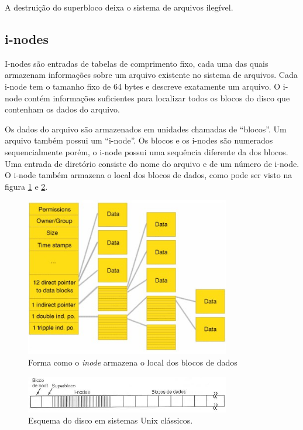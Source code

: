 \begin{citacao}
A destruição do superbloco deixa o sistema de arquivos ilegível.
\end{citacao}

\subsection{i-nodes}

I-nodes são entradas de tabelas de comprimento fixo, cada uma das quais armazenam informações sobre um arquivo existente no sistema de arquivos. Cada i-node tem o tamanho fixo de 64 bytes e descreve exatamente um arquivo. O i-node contém informações suficientes para localizar todos os blocos do disco que contenham os dados do arquivo.

Os dados do arquivo são armazenados em unidades chamadas de ``blocos''. Um arquivo também possui um ``i-node''. Os blocos e os i-nodes são numerados sequencialmente porém, o i-node possui uma sequência diferente da dos blocos. Uma entrada de diretório consiste do nome do arquivo e de um número de i-node. O i-node também armazena o local dos blocos de dados, como pode ser visto na figura \ref{fig:inode} e \ref{fig:inode_esquema}.

\begin{figure}
	\centering
	\includegraphics[width=0.8\textwidth]{sistemas_de_arquivos/fig/inode.jpg}
	\caption{Forma como o \emph{inode} armazena o local dos blocos de dados}
	\label{fig:inode}
\end{figure}

\begin{figure}
	\centering
	\includegraphics[width=0.8\textwidth]{sistemas_de_arquivos/fig/inode_esquema.jpg}
	\caption{Esquema do disco em sistemas Unix clássicos.}
	\label{fig:inode_esquema}
\end{figure}

